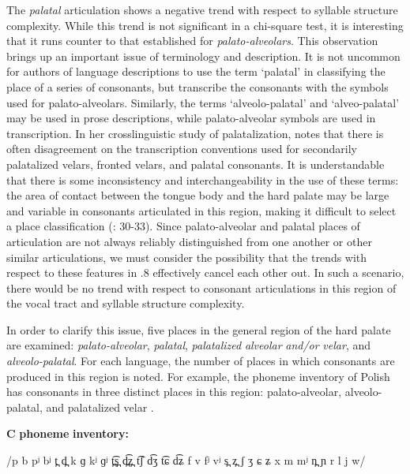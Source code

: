   The \textit{palatal} articulation shows a negative trend with respect to syllable structure complexity. While this trend is not significant in a chi-square test, it is interesting that it runs counter to that established for \textit{palato-alveolars}. This observation brings up an important issue of terminology and description. It is not uncommon for authors of language descriptions to use the term ‘palatal’ in classifying the place of a series of consonants, but transcribe the consonants with the symbols used for palato-alveolars. Similarly, the terms ‘alveolo-palatal’ and ‘alveo-palatal’ may be used in prose descriptions, while palato-alveolar symbols are used in transcription. In her crosslinguistic study of palatalization, \citet{Bateman2007} notes that there is often disagreement on the transcription conventions used for secondarily palatalized velars, fronted velars, and palatal consonants. It is understandable that there is some inconsistency and interchangeability in the use of these terms: the area of contact between the tongue body and the hard palate may be large and variable in consonants articulated in this region, making it difficult to select a place classification (\citealt{LadefogedMaddieson1996}: 30-33). Since palato-alveolar and palatal places of articulation are not always reliably distinguished from one another or other similar articulations, we must consider the possibility that the trends with respect to these features in .8 effectively cancel each other out. In such a scenario, there would be no trend with respect to consonant articulations in this region of the vocal tract and syllable structure complexity.

  In order to clarify this issue, five places in the general region of the hard palate are examined: \textit{palato-alveolar}, \textit{palatal}, \textit{palatalized} \textit{alveolar} \textit{and/or} \textit{velar}, and \textit{alveolo-palatal}. For each language, the number of places in which consonants are produced in this region is noted. For example, the phoneme inventory of Polish has consonants in three distinct places in this region: palato-alveolar, alveolo-palatal, and palatalized velar .

\ea\label{ex:(4.32)}

\textbf{C} \textbf{phoneme} \textbf{inventory:} 

/p b pʲ bʲ t̪ d̪ k ɡ kʲ ɡʲ t̪͡s̪ d̪͡z̪ t͡ʃ d͡ʒ t͡ɕ d͡ʑ f v fʲ vʲ s̪ z̪ ʃ ʒ ɕ ʑ x m mʲ n̪ ɲ r l j w/
\z

